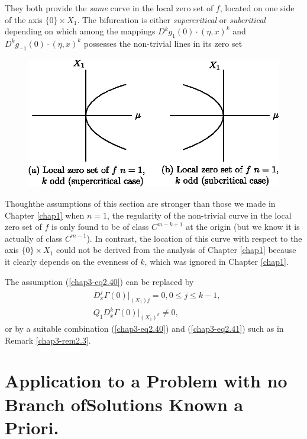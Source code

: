 They both provide the {\em same} curve in the local zero set of $f$,
located on one side of the axis $\{0\} \times X_{1}$. The bifurcation
is either {\em supercritical} or {\em subcritical} depending on which
among the mappings $D^{k}g_{1}(0) \cdot (\eta, x)^{k}$ and
$D^{k}g_{-1}(0) \cdot (\eta, x)^{k}$ possesses the non-trivial lines
in its zero set
\begin{figure}[H]
\centering
\includegraphics{figure/fig76-2.6.eps}
\caption{}
\end{figure}



\begin{remark}\label{chap3-rem2.8}
Though\pageoriginale the assumptions of this section are stronger than
those we made in Chapter \ref{chap1} when $n = 1$, the regularity of
the non-trivial curve in the local zero set of $f$ is only found to be
of class $C^{m-k+1}$ at the origin (but we know it is actually of
class $C^{m-1}$). In contrast, the location of this curve with respect
to the axis $\{0\} \times X_{1}$ could not be derived from the
analysis of Chapter \ref{chap1} because it clearly depends on the
evenness of $k$, which was ignored in Chapter \ref{chap1}.
\end{remark}

\begin{remark}\label{chap3-rem2.9}
The assumption (\ref{chap3-eq2.40}) can be replaced by 
\begin{align*}
& D_{x}^{j}\Gamma(0) |_{(X_{1})j} = 0, 0 \leq j \leq k-1,\\
& Q_{1}D_{x}^{k}\Gamma(0) |_{(X_{1})^{k}} \neq 0,\tag{2.41}\label{chap3-eq2.41}
\end{align*}
or by a suitable combination (\ref{chap3-eq2.40}) and
(\ref{chap3-eq2.41}) such as in Remark \ref{chap3-rem2.3}.
\end{remark}

\section[Application to a Problem......]{Application to a Problem with
  no Branch of\hfil\break Solutions Known a   Priori.}\label{chap3-sec3} 

